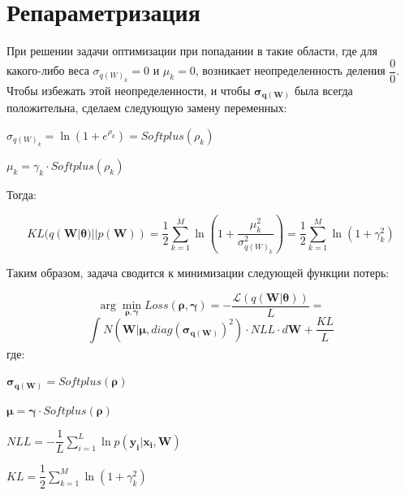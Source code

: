 \documentclass{article}
\newcommand{\argmin}{\arg\!\min}
\begin{document}
\section{Репараметризация}

При решении задачи оптимизации при попадании в такие области, где для какого-либо веса $\sigma_{{q(W)_{k}}} = 0$ и $\mu_{k} = 0$, возникает неопределенность деления $\dfrac{0}{0}$. Чтобы избежать этой неопределенности, и чтобы $\pmb{\sigma_{q(\mathbf{W})}}$ была всегда положительна, сделаем следующую замену переменных:

$\sigma_{{q(W)_{k}}} = \ln({1 + e^{\rho_{k}}}) = Softplus(\rho_{k})$

$\mu_{k} = \gamma_{k} \cdot Softplus(\rho_{k})$

Тогда:

\[
KL(q(\mathbf{W} | \pmb{\theta}) || p(\mathbf{W})) =
\dfrac{1}{2}\sum_{k=1}^{M}\ln({1 + \dfrac{\mu_{k}^2}{\sigma_{{q(W)_{k}}}^2}}) =
\dfrac{1}{2}\sum_{k=1}^{M}\ln({1 + \gamma_{k}^{2}})
\]

Таким образом, задача сводится к минимизации следующей функции потерь:

\[
\argmin_{\pmb{\rho}, \pmb{\gamma}} Loss(\pmb{\rho}, \pmb{\gamma}) =
- \dfrac{\mathcal{L}(q(\mathbf{W} | \pmb{\theta}))}{L} =
\]\[
\int_{}{} N(\mathbf{W} | \pmb{\mu}, diag(\pmb{\sigma_{q(\mathbf{W})}})^{2}) \cdot NLL \cdot d\mathbf{W} + \dfrac{KL}{L}
\] где:

$\pmb{\sigma_{q(\mathbf{W})}} = Softplus(\pmb{\rho})$

$\pmb{\mu} = \pmb{\gamma} \cdot Softplus(\pmb{\rho})$

$NLL = -\dfrac{1}{L}\sum_{i=1}^{L}{\ln{p( \mathbf{y_{i}} | \mathbf{x_{i}}, \mathbf{W})}}$

$KL = \dfrac{1}{2}\sum_{k=1}^{M}\ln({1 + \gamma_{k}^{2}})$
\end{document}
